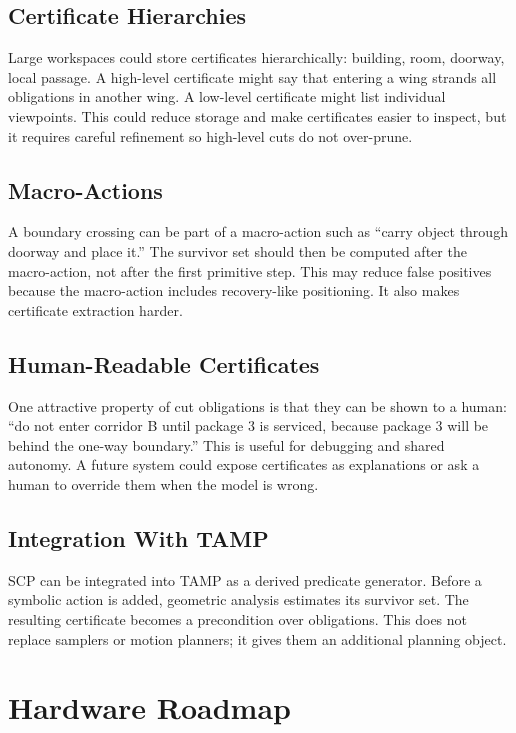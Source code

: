 \documentclass{article}
\begin{document}
\subsection{Certificate Hierarchies}

Large workspaces could store certificates hierarchically: building, room, doorway, local passage. A high-level certificate might say that entering a wing strands all obligations in another wing. A low-level certificate might list individual viewpoints. This could reduce storage and make certificates easier to inspect, but it requires careful refinement so high-level cuts do not over-prune.

\subsection{Macro-Actions}

A boundary crossing can be part of a macro-action such as ``carry object through doorway and place it.'' The survivor set should then be computed after the macro-action, not after the first primitive step. This may reduce false positives because the macro-action includes recovery-like positioning. It also makes certificate extraction harder.

\subsection{Human-Readable Certificates}

One attractive property of cut obligations is that they can be shown to a human: ``do not enter corridor B until package 3 is serviced, because package 3 will be behind the one-way boundary.'' This is useful for debugging and shared autonomy. A future system could expose certificates as explanations or ask a human to override them when the model is wrong.

\subsection{Integration With TAMP}

SCP can be integrated into TAMP as a derived predicate generator. Before a symbolic action is added, geometric analysis estimates its survivor set. The resulting certificate becomes a precondition over obligations. This does not replace samplers or motion planners; it gives them an additional planning object.

\section{Hardware Roadmap}
\end{document}
